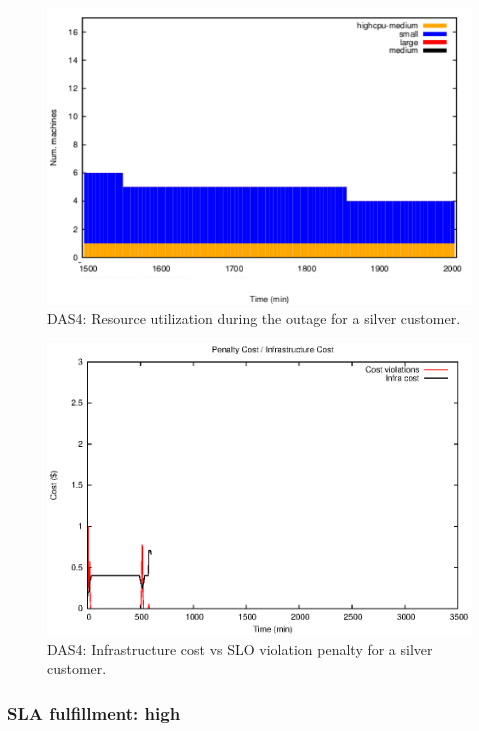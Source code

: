 \begin{figure}
  \begin{center}
    \includegraphics[width=.85\linewidth]{images/exps2011/medium/das/inst_type_machines_filtered.pdf}
  \end{center}
\vspace{-5mm}
  \caption{DAS4: Resource utilization during the outage for a silver customer.}
  \label{resOutage}
\end{figure}

\begin{figure}
  \begin{center}
    \includegraphics[width=.85\linewidth]{images/exps2011/medium/das/penaltyVScost.eps}
  \end{center}
\vspace{-5mm}
  \caption{DAS4: Infrastructure cost vs SLO violation penalty for a silver customer.}
  \label{mediumPenalty}
\end{figure}

\subsubsection{SLA fulfillment: high}

